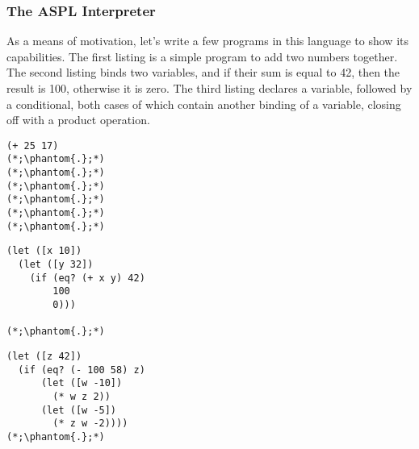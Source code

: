\subsubsection{The ASPL Interpreter}

As a means of motivation, let's write a few programs in this language to show its capabilities. The first listing is a simple program to add two numbers together. The second listing binds two variables, and if their sum is equal to 42, then the result is 100, otherwise it is zero. The third listing declares a variable, followed by a conditional, both cases of which contain another binding of a variable, closing off with a product operation.

\noindent %
\begin{minipage}[t]{0.32\textwidth}
\begin{lstlisting}[language=MyScheme, frame=single]
(+ 25 17)
(*;\phantom{.};*)
(*;\phantom{.};*)
(*;\phantom{.};*)
(*;\phantom{.};*)
(*;\phantom{.};*)
(*;\phantom{.};*)
\end{lstlisting}
\end{minipage}%
\hfill %
\begin{minipage}[t]{0.32\textwidth}
\begin{lstlisting}[language=MyScheme, frame=single]
(let ([x 10])
  (let ([y 32])
    (if (eq? (+ x y) 42)
        100
        0)))

(*;\phantom{.};*)
\end{lstlisting}
\end{minipage}%
\hfill %
\begin{minipage}[t]{0.32\textwidth}
\begin{lstlisting}[language=MyScheme, frame=single]
(let ([z 42])
  (if (eq? (- 100 58) z)
      (let ([w -10])
        (* w z 2))
      (let ([w -5])
        (* z w -2))))
(*;\phantom{.};*)
\end{lstlisting}
\end{minipage}

